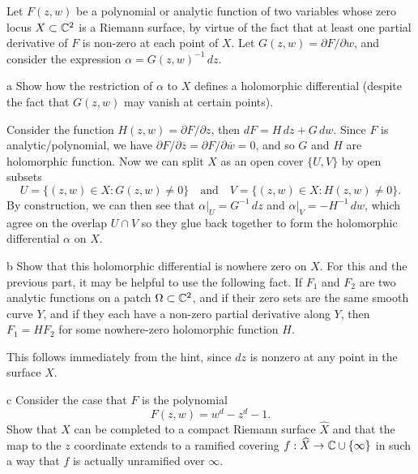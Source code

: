 \documentclass[expanded]{lkx_pset}
\begin{document}
\begin{problem}{4}
Let $F(z,w)$ be a polynomial or analytic function of two variables whose zero locus $X\subset \mathbb{C}^2$ is a Riemann surface, by virtue of the fact that at least one partial derivative of $F$ is non-zero at each point of $X$. Let $G(z,w)=\partial F/\partial w$, and consider the expression $\alpha = G(z,w)^{-1}\,dz$.
\end{problem}

\begin{parts}
	\begin{part}{a}
		Show how the restriction of $\alpha$ to $X$ defines a holomorphic differential (despite the fact that $G(z,w)$ may vanish at certain points).
	\end{part}

	Consider the function $H(z,w)=\partial F/\partial z$, then $dF = H\,dz+G\,dw$. Since $F$ is analytic/polynomial, we have $\partial F/\partial \overline{z}=\partial F/\partial \overline{w}=0$, and so $G$ and $H$ are holomorphic function. Now we can split $X$ as an open cover $\{U,V\}$ by open subsets
	\[
		U = \{(z,w)\in X : G(z,w)\neq 0\}\quad\textrm{and}\quad V = \{(z,w)\in X : H(z,w)\neq 0\}.
	\]
	By construction, we can then see that $\alpha|_{U} = G^{-1}\,dz$ and $\alpha|_{V}=-H^{-1}\,dw$, which agree on the overlap $U\cap V$ so they glue back together to form the holomorphic differential $\alpha$ on $X$.

	\begin{part}{b}
		Show that this holomorphic differential is nowhere zero on $X$. For this and the previous part, it may be helpful to use the following fact. If $F_1$ and $F_2$ are two analytic functions on a patch $\Omega\subset \mathbb{C}^2$, and if their zero sets are the same smooth curve $Y$, and if they each have a non-zero partial derivative along $Y$, then $F_1=HF_2$ for some nowhere-zero holomorphic function $H$.
	\end{part}

	This follows immediately from the hint, since $dz$ is nonzero at any point in the surface $X$.

	\begin{part}{c}
		Consider the case that $F$ is the polynomial
		\[
			F(z,w)=w^d-z^d - 1.
		\]
		Show that $X$ can be completed to a compact Riemann surface $\widehat{X}$ and that the map to the $z$ coordinate extends to a ramified covering $f : \widehat{X} \to \mathbb{C}\cup \{\infty\}$ in such a way that $f$ is actually unramified over $\infty$.
	\end{part}


\end{parts}
\end{document}
